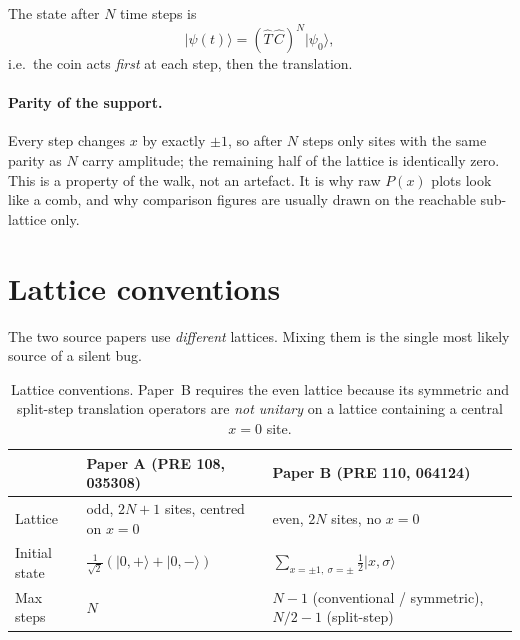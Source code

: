 \documentclass[11pt]{article}
\newcommand{\Cop}{\hat{C}}                          %
\newcommand{\Top}{\hat{T}}                          %
\newcommand{\ket}[1]{\lvert #1 \rangle}
\begin{document}
The state after $N$ time steps is
\begin{equation}
\ket{\psi(t)} = \left(\Top\,\Cop\right)^{N} \ket{\psi_0},
\label{eq:evolution}
\end{equation}
i.e.\ the coin acts \emph{first} at each step, then the translation.

\paragraph{Parity of the support.}
Every step changes $x$ by exactly $\pm 1$, so after $N$ steps only sites with
the same parity as $N$ carry amplitude; the remaining half of the lattice is
identically zero. This is a property of the walk, not an artefact. It is why
raw $P(x)$ plots look like a comb, and why comparison figures are usually
drawn on the reachable sub-lattice only.

\section{Lattice conventions}
\label{sec:lattice}

The two source papers use \emph{different} lattices. Mixing them is the
single most likely source of a silent bug.

\begin{table}[h]
\centering
\begin{tabular}{lll}
\toprule
 & \textbf{Paper A} (PRE \textbf{108}, 035308) & \textbf{Paper B} (PRE \textbf{110}, 064124) \\
\midrule
Lattice       & odd, $2N+1$ sites, centred on $x=0$ & even, $2N$ sites, no $x=0$ \\
Initial state & $\tfrac{1}{\sqrt{2}}\left(\ket{0,+}+\ket{0,-}\right)$
              & $\sum_{x=\pm 1,\ \sigma=\pm}\tfrac{1}{2}\ket{x,\sigma}$ \\
Max steps     & $N$ & $N-1$ (conventional / symmetric), $N/2-1$ (split-step) \\
\bottomrule
\end{tabular}
\caption{Lattice conventions. Paper~B requires the even lattice because its
symmetric and split-step translation operators are \emph{not unitary} on a
lattice containing a central $x=0$ site.}
\label{tab:lattice}
\end{table}
\end{document}
